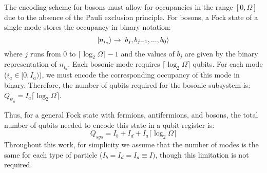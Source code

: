 The encoding scheme for bosons must allow for occupancies in the range $[0, \Omega]$ due to the absence of the Pauli exclusion principle.
For bosons, a Fock state of a single mode stores the occupancy in binary notation: 
\begin{equation}
    \ket{n_{i_a}} \rightarrow \ket{b_j, b_{j-1}, ..., b_0}
\end{equation}
where $j$ runs from $0$ to $\lceil \log_2{\Omega} \rceil - 1$ and the values of $b_j$ are given by the binary representation of $n_{i_a}$.
Each bosonic mode requires $\lceil \log_2{\Omega} \rceil$ qubits.
For each mode ($i_a \in [0, I_a)$), we must encode the corresponding occupancy of this mode in binary. 
Therefore, the number of qubits required for the bosonic subsystem is: $Q_{\psi_a} = I_a \lceil \log_2{\Omega} \rceil$.

Thus, for a general Fock state with fermions, antifermions, and bosons, the total number of qubits needed to encode this state in a qubit register is:
\begin{equation}
    Q_{sys} = I_b + I_d + I_a \lceil \log_2{\Omega} \rceil
\end{equation}
Throughout this work, for simplicity we assume that the number of modes is the same for each type of particle ($I_b = I_d = I_a \equiv I)$, though this limitation is not required.


